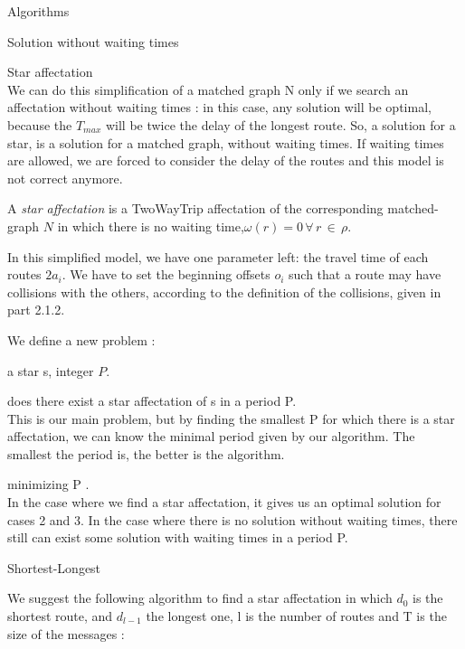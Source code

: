 \documentclass[a4paper,10pt]{report}
\begin{document}
\begin{chapter}{Algorithms}
\begin{section}{Solution without waiting times}
\begin{subsection}{Star affectation}
{{}}\\


We can do this simplification of a matched graph N only if we search an affectation without waiting times : in this case, any solution
will be optimal, because the $T_{max}$ will be twice the delay of the longest route. So, a solution for a star, is a solution for a matched
graph, without waiting times. If waiting times are allowed, we are forced to consider the delay of the routes and this model is not
correct anymore.

A \emph{star affectation} is a TwoWayTrip affectation of the corresponding matched-graph $N$
in which there is no waiting time,$\omega(r) = 0 \,\forall\, r \,\in\, \rho$. 

In this simplified model, we have one parameter left: the travel time of each routes $2a_i$.
We have to set the beginning offsets $o_i$ such that a route may have collisions with the others, 
according to the definition of the collisions, given in part 2.1.2.


We define a new problem : 



 a star s, integer $P$.

 does there exist a star affectation of s in a period P.\\

This is our main problem, but by finding the smallest P for which there is a star affectation, we can know 
the minimal period given by our algorithm. The smallest the period is, the better is the algorithm.


 minimizing P .\\

In the case where we find a star affectation, it gives us an optimal solution for cases 2 and 3.
In the case where there is no solution without waiting times, there still can exist some solution with waiting times in 
a period P.
\end{subsection}
\begin{subsection}{Shortest-Longest}
 
We suggest the following algorithm to find a star affectation in which $d_0$ is the shortest route, and $d_{l-1}$ the longest one, 
l is the number of routes and T is the size of the messages :

\begin{algorithm}[H]
\caption{Star affectation from shortest to longest}
\begin{algorithmic}


\end{algorithmic}
\end{algorithm}
\end{subsection}
\end{section}
\end{chapter}
\end{document}
